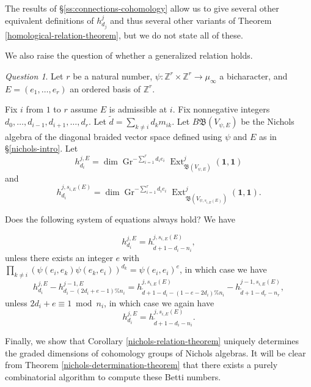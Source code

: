 \documentclass[11pt,letterpaper]{article}
\theoremstyle{definition}
\theoremstyle{remark}
\newtheorem{question}[theorem]{Question}
\numberwithin{equation}{section}
\theoremstyle{dotless}
\newcommand{\Gr}{\operatorname{Gr}}
\newcommand{\hchi}{\psi} %
\renewcommand{\tilde}{\widetilde}
\begin{document}
The results of \S\ref{ss:connections-cohomology} allow us to give several other equivalent definitions of $h^j_{d_j}$ and thus several other variants of Theorem \ref{homological-relation-theorem}, but we do not state all of these.

We also raise the question of whether a generalized relation holds.

\begin{question}\label{nichols-relation-question} Let $r$ be a natural number, $\hchi\colon \mathbb Z^r \times \mathbb Z^r \to\mu_\infty$ a bicharacter, and $E=(e_1,\dots,e_r)$ an ordered basis of $\mathbb Z^r$.

Fix $i$ from $1$ to $r$ assume $E$ is admissible at $i$. Fix nonnegative integers $d_0,\dots, d_{i-1}, d_{i+1},\dots, d_r$. Let $\tilde{d}= \sum_{k \neq i} d_k m_{ik}$. Let $B \mathfrak B( V_{\hchi,E} )$ be the Nichols algebra of the diagonal braided vector space defined using $\hchi$ and $E$ as in \S\ref{nichols-intro}. Let
\[ h^{j,E}_{d_i} = \dim \Gr^{ -\sum_{i=1}^r d_i e_i}  \operatorname{Ext}^{j } _{ \mathfrak B( V_{\hchi,E} )} (\mathbf 1, \mathbf 1) \] and
        \[ h^{j, s_{i,E}(E)}_{d_i}= \dim \Gr^{ -\sum_{i=1}^r d_i e_i}  \operatorname{Ext}^{j } _{ \mathfrak B( V_{\hchi,s_{i,E}(E) } )} (\mathbf 1, \mathbf 1) .\] 

Does the following system of equations always hold? We have

   \begin{equation} h^{j,E}_{d_i} = h^{j, s_{i,E}(E)}_{\tilde{d}+1-d_i-n_i},\end{equation}
   unless there exists an integer $e$ with $\prod_{k\neq i}( \hchi(e_i,e_k) \hchi(e_k,e_i))^{d_k} = \hchi(e_i,e_i)^e$, in which case we have
    \begin{equation}h^{j,E}_{d_i} - h^{j-1,E}_{d_i - (2d_i+e -1)\%n_i} = h^{j,s_{i,E}(E)}_{\tilde{d}+1-d_i - (1-e-2d_i)\% n_i} - h^{j-1,s_{i,E}(E)}_{\tilde{d}+1-d_r-n_r},  \end{equation}
unless $2d_i +e \equiv 1 \bmod n_i$, in which case we again have
\begin{equation} h^{j,E}_{d_i} = h^{j, s_{i,E}(E)}_{\tilde{d}+1-d_i-n_i}.\end{equation}

\end{question}

Finally, we show that Corollary \ref{nichols-relation-theorem} uniquely determines the graded dimensions of cohomology groups of Nichols algebras. It will be clear from Theorem \ref{nichols-determination-theorem} that there exists a purely combinatorial algorithm to compute these Betti numbers.
\end{document}

